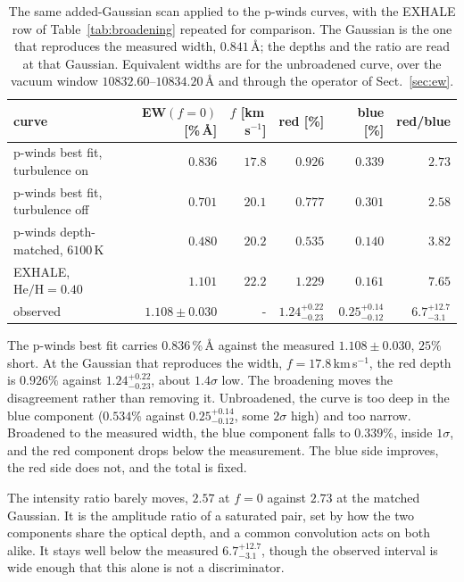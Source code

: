 \documentclass[english,a4paper]{my_memo}
\begin{document}
\begin{table}[htbp]\centering
\caption{The same added-Gaussian scan applied to the p-winds curves, with the
EXHALE row of Table~\ref{tab:broadening} repeated for comparison. The
Gaussian is the one that reproduces the measured width, $0.841$\,\AA; the
depths and the ratio are read at that Gaussian. Equivalent widths are for the
unbroadened curve, over the vacuum window $10832.60$--$10834.20$\,\AA{} and
through the operator of Sect.~\ref{sec:ew}.}
\label{tab:pwbroad}
\begin{tabular}{lrrrrr}
\toprule
curve & EW$(f{=}0)$ [\%\,\AA] & $f$ [km\,s$^{-1}$] & red [\%] & blue [\%] &
red/blue \\
\midrule
p-winds best fit, turbulence on  & $0.836$ & $17.8$ & $0.926$ & $0.339$ &
$2.73$ \\
p-winds best fit, turbulence off & $0.701$ & $20.1$ & $0.777$ & $0.301$ &
$2.58$ \\
p-winds depth-matched, $6100$\,K & $0.480$ & $20.2$ & $0.535$ & $0.140$ &
$3.82$ \\
EXHALE, $\mathrm{He/H} = 0.40$   & $1.101$ & $22.2$ & $1.229$ & $0.161$ &
$7.65$ \\
\midrule
observed & $1.108 \pm 0.030$ & - & $1.24^{+0.22}_{-0.23}$ &
$0.25^{+0.14}_{-0.12}$ & $6.7^{+12.7}_{-3.1}$ \\
\bottomrule
\end{tabular}
\end{table}

The p-winds best fit carries $0.836$\,\%\,\AA{} against the measured
$1.108 \pm 0.030$, $25\%$ short. At the Gaussian that reproduces the width,
$f = 17.8$\,km\,s$^{-1}$, the red depth is $0.926\%$ against
$1.24^{+0.22}_{-0.23}$, about $1.4\sigma$ low. The broadening moves the
disagreement rather than removing it. Unbroadened, the curve is too deep in
the blue component ($0.534\%$ against $0.25^{+0.14}_{-0.12}$, some $2\sigma$
high) and too narrow. Broadened to the measured width, the blue component
falls to $0.339\%$, inside $1\sigma$, and the red component drops below the
measurement. The blue side improves, the red side does not, and the total is
fixed.

The intensity ratio barely moves, $2.57$ at $f = 0$ against $2.73$ at the
matched Gaussian. It is the amplitude ratio of a saturated pair, set by how
the two components share the optical depth, and a common convolution acts on
both alike. It stays well below the measured $6.7^{+12.7}_{-3.1}$, though the
observed interval is wide enough that this alone is not a discriminator.
\end{document}
